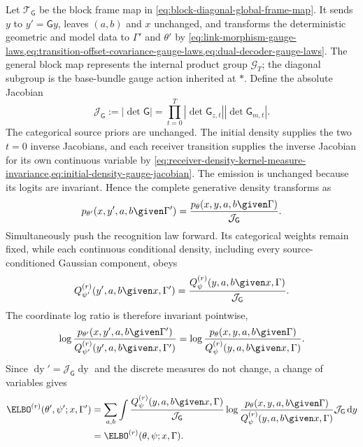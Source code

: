 Let $\mathcal T_{\mathsf G}$ be the block frame map in \cref{eq:block-diagonal-global-frame-map}. It sends $y$ to $y'=\mathsf G y$, leaves $(a,b)$ and $x$ unchanged, and transforms the deterministic geometric and model data to $\Gamma'$ and $\theta'$ by \cref{eq:link-morphism-gauge-laws,eq:transition-offset-covariance-gauge-laws,eq:dual-decoder-gauge-laws}. The general block map represents the internal product group $\mathcal G_T$; the diagonal subgroup is the base-bundle gauge action inherited at $\ast$. Define the absolute Jacobian
\begin{equation}
\mathcal J_{\mathsf G}
:=|\det\mathsf G|
=\prod_{t=0}^{T}
|\det\mathsf G_{z,t}|
|\det\mathsf G_{m,t}|.
\label{eq:global-frame-jacobian}
\end{equation}
The categorical source priors are unchanged. The initial density supplies the two $t=0$ inverse Jacobians, and each receiver transition supplies the inverse Jacobian for its own continuous variable by \cref{eq:receiver-density-kernel-measure-invariance,eq:initial-density-gauge-jacobian}. The emission is unchanged because its logits are invariant. Hence the complete generative density transforms as
\begin{equation}
p_{\theta'}(x,y',a,b\given\Gamma')
=\frac{p_\theta(x,y,a,b\given\Gamma)}
{\mathcal J_{\mathsf G}}.
\label{eq:complete-generative-density-pushforward}
\end{equation}
Simultaneously push the recognition law forward. Its categorical weights remain fixed, while each continuous conditional density, including every source-conditioned Gaussian component, obeys
\begin{equation}
Q_{\psi'}^{(r)}(y',a,b\given x,\Gamma')
=\frac{Q_\psi^{(r)}(y,a,b\given x,\Gamma)}
{\mathcal J_{\mathsf G}}.
\label{eq:complete-recognition-density-pushforward}
\end{equation}
The coordinate log ratio is therefore invariant pointwise,
\begin{equation}
\log\frac{p_{\theta'}(x,y',a,b\given\Gamma')}
{Q_{\psi'}^{(r)}(y',a,b\given x,\Gamma')}
=\log\frac{p_\theta(x,y,a,b\given\Gamma)}
{Q_\psi^{(r)}(y,a,b\given x,\Gamma)}.
\label{eq:complete-elbo-log-ratio-invariance}
\end{equation}
Since $\mathop{\mathrm dy}'=\mathcal J_{\mathsf G}\mathop{\mathrm dy}$ and the discrete measures do not change, a change of variables gives
\begin{equation}
\begin{aligned}
\ELBO^{(r)}(\theta',\psi';x,\Gamma')
&=\sum_{a,b}\int
\frac{Q_\psi^{(r)}(y,a,b\given x,\Gamma)}
{\mathcal J_{\mathsf G}}
\log\frac{p_\theta(x,y,a,b\given\Gamma)}
{Q_\psi^{(r)}(y,a,b\given x,\Gamma)}
\mathcal J_{\mathsf G}\mathop{\mathrm dy}\\
&=\ELBO^{(r)}(\theta,\psi;x,\Gamma).
\end{aligned}
\label{eq:complete-elbo-gauge-invariance}
\end{equation}
